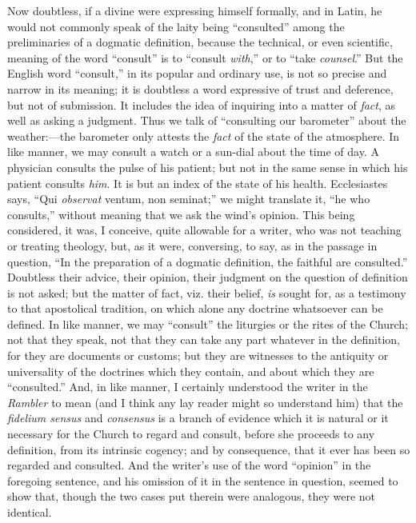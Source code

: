 Now doubtless, if a divine were expressing himself
formally, and in Latin, he would not commonly speak of the laity being ``consulted''
among the preliminaries of a dogmatic definition, because the technical,
or even scientific, meaning of the word ``consult'' is to ``consult \emph{with},''
or to ``take \emph{counsel}.'' But the English word ``consult,'' in its
popular and ordinary use, is not so precise and narrow in its meaning;
it is doubtless a word expressive of trust and deference, but not of
submission. It includes the idea of inquiring into a matter of \emph{fact},
as well as asking a judgment. Thus we talk of ``consulting our barometer''
about the weather:—the barometer only attests the \emph{fact} of the
state of the atmosphere. In like manner, we may consult a watch or a
sun-dial about the time of day. A physician consults the pulse of his
patient; but not in the same sense in which his patient consults \emph{him}.
It is but an index of the state of his health. Ecclesiastes says, ``Qui \emph{observat}
ventum, non seminat;'' we might translate it, ``he who consults,'' without
meaning that we ask the wind's opinion. This being considered, it was, I
conceive, quite allowable for a writer, who was not teaching or treating
theology, but, as it were, conversing, to say, as in the passage in
question, ``In the preparation of a dogmatic definition, the faithful are
consulted.'' Doubtless their advice, their opinion, their judgment on the
question of definition is not asked; but the matter of fact, viz. their
belief, \emph{is} sought for, as a testimony to that apostolical
tradition, on which alone any doctrine whatsoever can be defined. In
like manner, we may ``consult'' the liturgies or the rites of the Church;
not that they speak, not that they can take any part whatever in the
definition, for they are documents or customs; but they are witnesses to
the antiquity or universality of the doctrines which they contain, and
about which they are ``consulted.'' And, in like manner, I certainly
understood the writer in the \emph{Rambler} to mean (and I think any lay
reader might so understand him) that the \emph{fidelium sensus} and \emph{consensus}
is a branch of evidence which it is natural or it necessary for
the Church to regard and consult, before she proceeds to any definition,
from its intrinsic cogency; and by consequence, that it ever has been so
regarded and consulted. And the writer's use of the word ``opinion'' in
the foregoing sentence, and his omission of it in the sentence in
question, seemed to show that, though the two cases put therein were
analogous, they were not identical.

